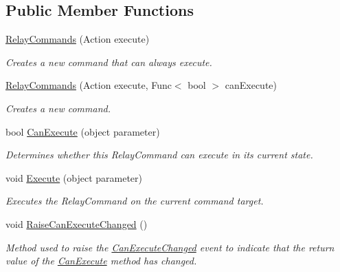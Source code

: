 \subsection*{Public Member Functions}
\begin{DoxyCompactItemize}
\item 
\mbox{\hyperlink{class_r_f_storage_1_1_relay_commands_1_1_relay_commands_abffa9ab4825fe92e6452d2580ae848ba}{Relay\+Commands}} (Action execute)
\begin{DoxyCompactList}\small\item\em Creates a new command that can always execute. \end{DoxyCompactList}\item 
\mbox{\hyperlink{class_r_f_storage_1_1_relay_commands_1_1_relay_commands_ad33c6e9f573620d9dc0d0d9249b72403}{Relay\+Commands}} (Action execute, Func$<$ bool $>$ can\+Execute)
\begin{DoxyCompactList}\small\item\em Creates a new command. \end{DoxyCompactList}\item 
bool \mbox{\hyperlink{class_r_f_storage_1_1_relay_commands_1_1_relay_commands_a65a37e91e18d693a8445d4b6e34e1ce6}{Can\+Execute}} (object parameter)
\begin{DoxyCompactList}\small\item\em Determines whether this Relay\+Command can execute in its current state. \end{DoxyCompactList}\item 
void \mbox{\hyperlink{class_r_f_storage_1_1_relay_commands_1_1_relay_commands_a6b61d7cc0250993b87aadc1d103829f0}{Execute}} (object parameter)
\begin{DoxyCompactList}\small\item\em Executes the Relay\+Command on the current command target. \end{DoxyCompactList}\item 
void \mbox{\hyperlink{class_r_f_storage_1_1_relay_commands_1_1_relay_commands_a73137b1aab2a5338b3e707007519bfda}{Raise\+Can\+Execute\+Changed}} ()
\begin{DoxyCompactList}\small\item\em Method used to raise the \mbox{\hyperlink{class_r_f_storage_1_1_relay_commands_1_1_relay_commands_a7ad91fe956842b7f151d01ee787d38c0}{Can\+Execute\+Changed}} event to indicate that the return value of the \mbox{\hyperlink{class_r_f_storage_1_1_relay_commands_1_1_relay_commands_a65a37e91e18d693a8445d4b6e34e1ce6}{Can\+Execute}} method has changed. \end{DoxyCompactList}\end{DoxyCompactItemize}
